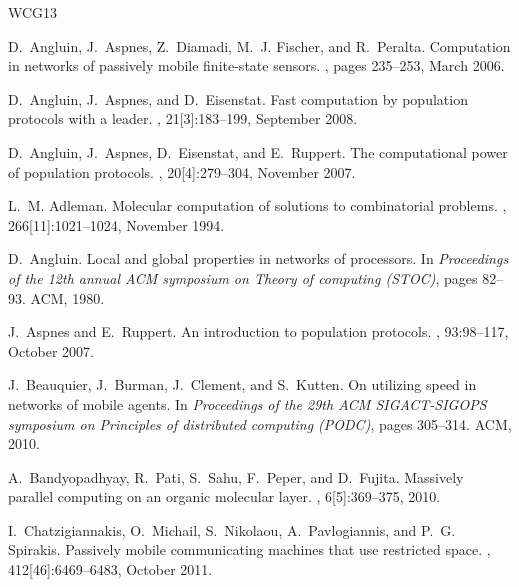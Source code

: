 \documentclass[oribibl, 11pt]{llncs}
\begin{document}
\newpage

\newcommand{\etalchar}[1]{}
\begin{thebibliography}{WCG{\etalchar{+}}13}

\bibitem[AAD{\etalchar{+}}06]{AADFP06}
D.~Angluin, J.~Aspnes, Z.~Diamadi, M.~J. Fischer, and R.~Peralta.
\newblock Computation in networks of passively mobile finite-state sensors.
, pages 235--253, March 2006.

D.~Angluin, J.~Aspnes, and D.~Eisenstat.
\newblock Fast computation by population protocols with a leader.
, 21[3]:183--199, September 2008.

D.~Angluin, J.~Aspnes, D.~Eisenstat, and E.~Ruppert.
\newblock The computational power of population protocols.
, 20[4]:279--304, November 2007.

L.~M. Adleman.
\newblock Molecular computation of solutions to combinatorial problems.
, 266[11]:1021--1024, November 1994.

D.~Angluin.
\newblock Local and global properties in networks of processors.
\newblock In {\em Proceedings of the 12th annual ACM symposium on Theory of
  computing (STOC)}, pages 82--93. ACM, 1980.

J.~Aspnes and E.~Ruppert.
\newblock An introduction to population protocols.
, 93:98--117, October 2007.

J.~Beauquier, J.~Burman, J.~Clement, and S.~Kutten.
\newblock On utilizing speed in networks of mobile agents.
\newblock In {\em Proceedings of the 29th ACM SIGACT-SIGOPS symposium on
  Principles of distributed computing (PODC)}, pages 305--314. ACM, 2010.

\bibitem[BPS{\etalchar{+}}10]{BPSPF10}
A.~Bandyopadhyay, R.~Pati, S.~Sahu, F.~Peper, and D.~Fujita.
\newblock Massively parallel computing on an organic molecular layer.
, 6[5]:369--375, 2010.

\bibitem[CMN{\etalchar{+}}11]{MNPS11}
I.~Chatzigiannakis, O.~Michail, S.~Nikolaou, A.~Pavlogiannis, and P.~G.
  Spirakis.
\newblock Passively mobile communicating machines that use restricted space.
, 412[46]:6469--6483, October 2011.


\end{thebibliography}
\end{document}
